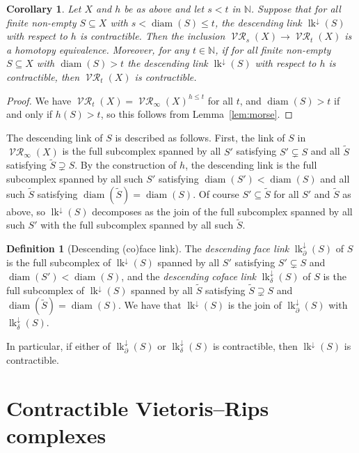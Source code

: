 \documentclass[a4paper,11pt]{amsart}
\newtheorem{corollary}[theorem]{Corollary}
\theoremstyle{definition}
\newtheorem{definition}[theorem]{Definition}
\newcommand{\N}{\mathbb{N}}
\DeclareMathOperator{\diam}{diam}
\DeclareMathOperator{\Rips}{\mathcal{VR}}
\newcommand{\lk}{\operatorname{lk}}
\newcommand{\dlk}{\lk^\downarrow\!}
\newcommand{\dflk}{\lk^\downarrow_\partial}
\newcommand{\dclk}{\lk^\downarrow_\delta}
\numberwithin{equation}{section}
\begin{document}
\begin{corollary}\label{cor:morse_rips}
Let $X$ and $h$ be as above and let $s<t$ in $\N$. Suppose that for all finite non-empty $S\subseteq X$ with $s<\diam(S)\le t$, the descending link $\dlk(S)$ with respect to $h$ is contractible. Then the inclusion $\Rips_s(X)\to\Rips_t(X)$ is a homotopy equivalence. Moreover, for any $t\in\N$, if for all finite non-empty $S\subseteq X$ with $\diam(S)>t$ the descending link $\dlk(S)$ with respect to $h$ is contractible, then $\Rips_t(X)$ is contractible.
\end{corollary}

\begin{proof}
We have $\Rips_t(X)=\Rips_\infty(X)^{h\le t}$ for all $t$, and $\diam(S)>t$ if and only if $h(S)>t$, so this follows from Lemma~\ref{lem:morse}.
\end{proof}

The descending link of $S$ is described as follows. First, the link of $S$ in $\Rips_\infty(X)$ is the full subcomplex spanned by all $S'$ satisfying $S'\subsetneq S$ and all $\widetilde{S}$ satisfying $\widetilde{S}\supsetneq S$. By the construction of $h$, the descending link is the full subcomplex spanned by all such $S'$ satisfying $\diam(S')<\diam(S)$ and all such $\widetilde{S}$ satisfying $\diam(\widetilde{S})=\diam(S)$. Of course $S'\subseteq \widetilde{S}$ for all $S'$ and $\widetilde{S}$ as above, so $\dlk(S)$ decomposes as the join of the full subcomplex spanned by all such $S'$ with the full subcomplex spanned by all such $\widetilde{S}$.

\begin{definition}[Descending (co)face link]
The \emph{descending face link} $\dflk(S)$ of $S$ is the full subcomplex of $\dlk(S)$ spanned by all $S'$ satisfying $S'\subsetneq S$ and $\diam(S')<\diam(S)$, and the \emph{descending coface link} $\dclk(S)$ of $S$ is the full subcomplex of $\dlk(S)$ spanned by all $\widetilde{S}$ satisfying $\widetilde{S}\supsetneq S$ and $\diam(\widetilde{S})=\diam(S)$. We have that $\dlk(S)$ is the join of $\dflk(S)$ with $\dclk(S)$.
\end{definition}

In particular, if either of $\dflk(S)$ or $\dclk(S)$ is contractible, then $\dlk(S)$ is contractible.




\section{Contractible Vietoris--Rips complexes}\label{sec:cible}
\end{document}

